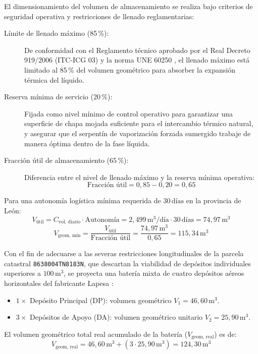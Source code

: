 \documentclass[12pt]{article}
\begin{document}
        El dimensionamiento del volumen de almacenamiento se realiza bajo criterios de seguridad operativa y restricciones de llenado reglamentarias:
        \begin{description}
            \item[Límite de llenado máximo (85\,\%):] De conformidad con el Reglamento técnico aprobado por el Real Decreto 919/2006 (ITC-ICG 03) \cite{rd919} y la norma UNE 60250 \cite{une60250}, el llenado máximo está limitado al 85\,\% del volumen geométrico para absorber la expansión térmica del líquido.
            \item[Reserva mínima de servicio (20\,\%):] Fijada como nivel mínimo de control operativo para garantizar una superficie de chapa mojada suficiente para el intercambio térmico natural, y asegurar que el serpentín de vaporización forzada sumergido trabaje de manera óptima dentro de la fase líquida.
            \item[Fracción útil de almacenamiento (65\,\%):] Diferencia entre el nivel de llenado máximo y la reserva mínima operativa:
            \begin{equation}
                \text{Fracción útil} = 0,85 - 0,20 = 0,65
            \end{equation}
        \end{description}

        Para una autonomía logística mínima requerida de $30\,\text{días}$ en la provincia de León:
        \begin{equation}
            V_{\text{útil}} = C_{\text{vol, diario}} \cdot \text{Autonomía} = 2,499\,\text{m}^3/\text{día} \cdot 30\,\text{días} = 74,97\,\text{m}^3
        \end{equation}
        \begin{equation}
            V_{\text{geom, mín}} = \frac{V_{\text{útil}}}{\text{Fracción útil}} = \frac{74,97\,\text{m}^3}{0,65} = 115,34\,\text{m}^3
        \end{equation}

        Con el fin de adecuarse a las severas restricciones longitudinales de la parcela catastral \texttt{8638004TN8183N}, que descartan la viabilidad de depósitos individuales superiores a $100\,\text{m}^3$, se proyecta una batería mixta de cuatro depósitos aéreos horizontales del fabricante Lapesa \cite{lapesa}:
        \begin{itemize}
            \item $1 \times$ Depósito Principal (DP): volumen geométrico $V_1 = 46,60\,\text{m}^3$.
            \item $3 \times$ Depósitos de Apoyo (DA): volumen geométrico unitario $V_2 = 25,90\,\text{m}^3$.
        \end{itemize}
        El volumen geométrico total real acumulado de la batería ($V_{\text{geom, real}}$) es de:
        \begin{equation}
            V_{\text{geom, real}} = 46,60\,\text{m}^3 + (3 \cdot 25,90\,\text{m}^3) = 124,30\,\text{m}^3
        \end{equation}
\end{document}
